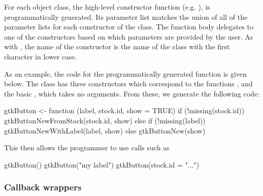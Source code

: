 \documentclass[article,shortnames]{jss}
\begin{document}
For each object class, the high-level constructor function (e.g.
), is programmatically generated. Its parameter list
matches the union of all of the parameter lists for each constructor
of the class. The function body delegates to one of the constructors
based on which parameters are provided by the user. As with
, the name of the constructor is the name
of the class with the first character in lower case. 

As an example, the code for the programmatically generated
 function is given below.  The 
class has three constructors which correspond to the functions
,
 and the basic ,
which takes no arguments. From these, we generate the following code:
\begin{Code}
gtkButton <- function (label, stock.id, show = TRUE) 
{
    if (!missing(stock.id)) {
        gtkButtonNewFromStock(stock.id, show)
    }
    else {
        if (!missing(label)) {
            gtkButtonNewWithLabel(label, show)
        }
        else {
            gtkButtonNew(show)
        }
    }
}
\end{Code}
This then allows the  programmer to use calls such as
\begin{Code}
gtkButton()
gtkButton("my label")
gtkButton(stock.id = "...")
\end{Code}

\subsubsection{Callback wrappers}
%

\end{document}
